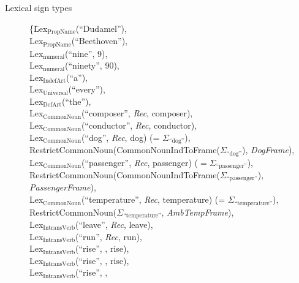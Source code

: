 \begin{description}



\item[Lexical sign types] \mbox{}

\begin{tabbing}
    \{\=Lex$_{\mathrm{PropName}}$(``Dudamel''), \\
    \> Lex$_{\mathrm{PropName}}$(``Beethoven''), \\
    \> Lex$_{\mathrm{numeral}}$(``nine'', 9), \\
    \> Lex$_{\mathrm{numeral}}$(``ninety'', 90), \\ 
    \> Lex$_{\mathrm{IndefArt}}$(``a''), \\
    \> Lex$_{\mathrm{Universal}}$(``every''), \\
\> Lex$_{\mathrm{DefArt}}$(``the''),\\
\> Lex$_{\text{CommonNoun}}$(``composer'', \textit{Rec}, composer),\\
\> Lex$_{\text{CommonNoun}}$(``conductor'', \textit{Rec}, conductor), \\
\> Lex$_{\text{CommonNoun}}$(``dog'', \textit{Rec}, dog) (= $\Sigma_{\text{``dog''}}$), \\
\> RestrictCommonNoun(CommonNounIndToFrame($\Sigma_{\text{``dog''}}$),
\textit{DogFrame}),\\
\> Lex$_{\mathrm{CommonNoun}}$(``passenger'', \textit{Rec}, passenger) ($=\Sigma_{\text{``passenger''}}$), \\
\> RestrictCommonNoun(CommonNounIndToFrame($\Sigma_{\text{``passenger''}}$),
\textit{PassengerFrame}), \\
\> Lex$_{\text{CommonNoun}}$(``temperature'', \textit{Rec},
temperature) (= $\Sigma_{\text{``temperature''}}$), \\
\> RestrictCommonNoun($\Sigma_{\text{``temperature''}}$,
\textit{AmbTempFrame}),\\
\> Lex$_{\mathrm{IntransVerb}}$(``leave'', \textit{Rec}, leave), \\
\> Lex$_{\mathrm{IntransVerb}}$(``run'', \textit{Rec}, run), \\
\> Lex$_{\mathrm{IntransVerb}}$(``rise'', ,
rise), \\
\> Lex$_{\mathrm{IntransVerb}}$(``rise'', ,
rise), \\
\> Lex$_{\mathrm{IntransVerb}}$(``rise'', ,

\end{tabbing}
\end{description}
